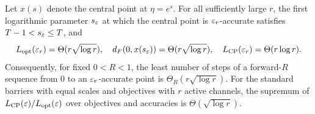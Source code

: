 \begin{theorem}
\label{thm:dyadic}
Let $x(s)$ denote the central point at $\eta=e^s$. For all sufficiently
large $r$, the first logarithmic parameter $s_\varepsilon$ at which the central
point is $\varepsilon_r$-accurate satisfies $T-1<s_\varepsilon\leq T$, and
\begin{equation}
 L_{\mathrm{opt}}(\varepsilon_r)=\Theta(r\sqrt{\log r}),\quad
 d_F(0,x(s_\varepsilon))=\Theta(r\sqrt{\log r}),\quad
 L_{\mathrm{CP}}(\varepsilon_r)=\Theta(r\log r).
 \label{eq:dyadic-lengths}
\end{equation}
Consequently, for fixed $0<R<1$, the least number of steps of a
forward-$R$ sequence from $0$ to an $\varepsilon_r$-accurate point is
$\Theta_R(r\sqrt{\log r})$.
For the standard barriers with equal scales and objectives with $r$
active channels, the supremum of
$L_{\mathrm{CP}}(\varepsilon)/L_{\mathrm{opt}}(\varepsilon)$ over objectives and accuracies is
$\Theta(\sqrt{\log r})$.
\end{theorem}
